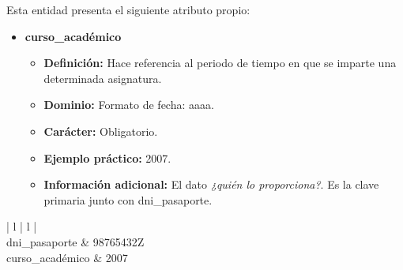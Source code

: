 \begin{description}
   \item[Descripción de los atributos propios] Esta entidad presenta el
   siguiente atributo propio:

   \begin{itemize}
   \item \textbf{curso\_académico}
      \begin{itemize}
         \item \textbf{Definición:} Hace referencia al periodo de tiempo en que se imparte una determinada asignatura.
         \item \textbf{Dominio:} Formato de fecha: aaaa.
         \item \textbf{Carácter:}  Obligatorio.
         \item \textbf{Ejemplo práctico:} 2007.
         \item \textbf{Información adicional:} El dato \textit{¿quién lo proporciona?}. Es la clave primaria junto con dni\_pasaporte.
      \end{itemize}
   \end{itemize}

   \item[Ejemplo práctico]

   \item \begin{center}
            \begin{tabular}{ | l | l | }
            \hline
             \\
            \hline
            dni\_pasaporte & 98765432Z \\
            \hline
            curso\_académico & 2007\\
            \hline
            \end{tabular}
         \end{center}
   \end{description}
